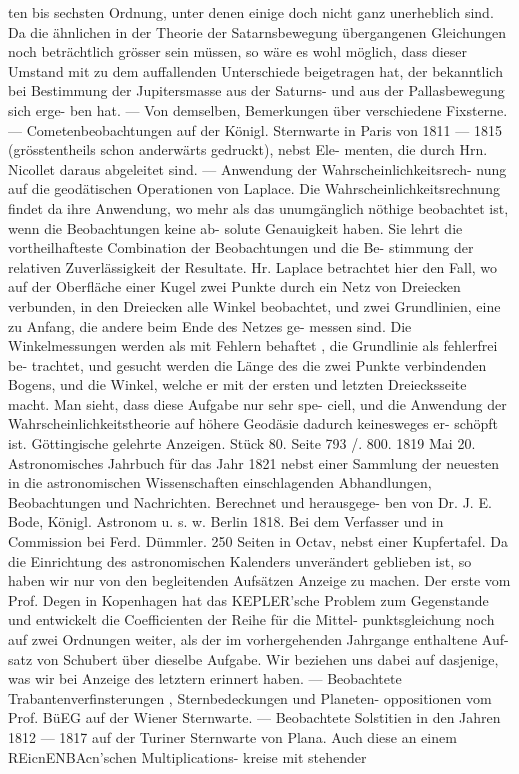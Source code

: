 \documentclass[12pt,a4paper]{article}
\begin{document}
{{{{{{{{ten  bis  sechsten  Ordnung,  unter  denen  einige  doch  nicht  ganz  unerheblich  sind.  Da  die  ähnlichen  in der  Theorie  der  Satarnsbewegung  übergangenen  Gleichungen  noch  beträchtlich  grösser  sein  müssen,  so wäre  es  wohl  möglich,  dass  dieser  Umstand  mit  zu  dem  auffallenden  Unterschiede  beigetragen  hat,  der bekanntlich  bei  Bestimmung  der  Jupitersmasse  aus  der  Saturns-  und  aus  der  Pallasbewegung  sich  erge- ben hat.  ---  Von  demselben,  Bemerkungen  über  verschiedene  Fixsterne.  ---  Cometenbeobachtungen  auf der  Königl.  Sternwarte  in  Paris  von  1811  --- 1815  (grösstentheils  schon  anderwärts  gedruckt),  nebst  Ele- menten, die  durch  Hrn.  Nicollet  daraus  abgeleitet  sind.  ---  Anwendung  der  Wahrscheinlichkeitsrech- nung auf  die  geodätischen  Operationen  von  Laplace.  Die  Wahrscheinlichkeitsrechnung  findet  da  ihre Anwendung,  wo  mehr  als  das  unumgänglich  nöthige  beobachtet  ist,  wenn  die  Beobachtungen  keine  ab- solute Genauigkeit  haben.  Sie  lehrt  die  vortheilhafteste  Combination  der  Beobachtungen  und  die  Be- stimmung der  relativen  Zuverlässigkeit  der  Resultate.  Hr.  Laplace  betrachtet  hier  den  Fall,  wo  auf der  Oberfläche  einer  Kugel  zwei  Punkte  durch  ein  Netz  von  Dreiecken  verbunden,  in  den  Dreiecken alle  Winkel  beobachtet,  und  zwei  Grundlinien,  eine  zu  Anfang,  die  andere  beim  Ende  des  Netzes  ge- messen sind.  Die  Winkelmessungen  werden  als  mit  Fehlern  behaftet ,  die  Grundlinie  als  fehlerfrei  be- trachtet, und  gesucht  werden  die  Länge  des  die  zwei  Punkte  verbindenden  Bogens,  und  die  Winkel, welche  er  mit  der  ersten  und  letzten  Dreiecksseite  macht.  Man  sieht,  dass  diese  Aufgabe  nur  sehr  spe- ciell,  und  die  Anwendung  der  Wahrscheinlichkeitstheorie  auf  höhere  Geodäsie  dadurch  keinesweges  er- schöpft ist. Göttingische  gelehrte  Anzeigen.     Stück  80.     Seite  793  /.  800.     1819  Mai  20. Astronomisches  Jahrbuch  für  das  Jahr  1821  nebst  einer  Sammlung  der  neuesten  in  die  astronomischen Wissenschaften  einschlagenden  Abhandlungen,  Beobachtungen  und  Nachrichten.  Berechnet  und  herausgege- ben von  Dr.  J.  E.  Bode,  Königl.  Astronom  u.  s.  w.  Berlin  1818.  Bei  dem  Verfasser  und  in  Commission bei  Ferd.  Dümmler.    250  Seiten  in  Octav,  nebst  einer  Kupfertafel. Da  die  Einrichtung  des  astronomischen  Kalenders  unverändert  geblieben  ist,  so  haben  wir  nur von  den  begleitenden  Aufsätzen  Anzeige  zu  machen.  Der  erste  vom  Prof.  Degen  in  Kopenhagen  hat das  KEPLER'sche  Problem  zum  Gegenstande  und  entwickelt  die  Coefficienten  der  Reihe  für  die  Mittel- punktsgleichung noch  auf  zwei  Ordnungen  weiter,  als  der  im  vorhergehenden  Jahrgange  enthaltene  Auf- satz von  Schubert  über  dieselbe  Aufgabe.  Wir  beziehen  uns  dabei  auf  dasjenige,  was  wir  bei  Anzeige des  letztern  erinnert  haben.  ---  Beobachtete  Trabantenverfinsterungen ,  Sternbedeckungen  und  Planeten- oppositionen vom  Prof.  BüEG  auf  der  Wiener  Sternwarte.  ---  Beobachtete  Solstitien  in  den  Jahren  1812 --- 1817  auf  der  Turiner  Sternwarte  von  Plana.  Auch  diese  an  einem  REicnENBAcn'schen  Multiplications- kreise  mit  stehender }}}}}}}}
\end{document}
